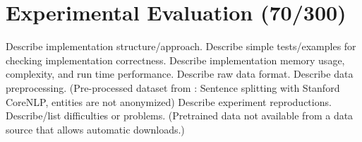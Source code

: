 \section{Experimental Evaluation (70/300)}

Describe implementation structure/approach.
Describe simple tests/examples for checking implementation correctness.
Describe implementation memory usage, complexity, and run time performance.
Describe raw data format.
Describe data preprocessing. (Pre-processed dataset from \citeauthor{LiuL2019}: Sentence splitting  with Stanford CoreNLP, entities are not anonymized)
Describe experiment reproductions.
Describe/list difficulties or problems. (Pretrained data not available from a data source that allows automatic downloads.)
